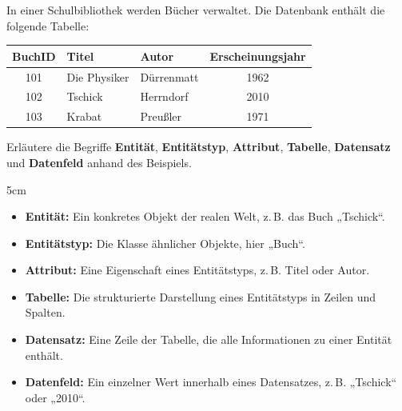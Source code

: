 \question[4]
In einer Schulbibliothek werden Bücher verwaltet. Die Datenbank enthält die folgende Tabelle:

\begin{center}
\begin{tabular}{|c|l|l|c|}
\hline
BuchID & Titel & Autor & Erscheinungsjahr \\
\hline
101 & Die Physiker & Dürrenmatt & 1962 \\
102 & Tschick & Herrndorf & 2010 \\
103 & Krabat & Preußler & 1971 \\
\hline
\end{tabular}
\end{center}

Erläutere die Begriffe \textbf{Entität}, \textbf{Entitätstyp},
\textbf{Attribut}, \textbf{Tabelle}, \textbf{Datensatz} und
\textbf{Datenfeld} anhand des Beispiels.

\begin{solutionbox}{5cm}
\begin{itemize}
\item \textbf{Entität:} Ein konkretes Objekt der realen Welt, z.\,B. das Buch „Tschick“.
\item \textbf{Entitätstyp:} Die Klasse ähnlicher Objekte, hier „Buch“.
\item \textbf{Attribut:} Eine Eigenschaft eines Entitätstyps, z.\,B. Titel oder Autor.
\item \textbf{Tabelle:} Die strukturierte Darstellung eines Entitätstyps in Zeilen und Spalten.
\item \textbf{Datensatz:} Eine Zeile der Tabelle, die alle Informationen zu einer Entität enthält.
\item \textbf{Datenfeld:} Ein einzelner Wert innerhalb eines Datensatzes, z.\,B. „Tschick“ oder „2010“.
\end{itemize}
\end{solutionbox}